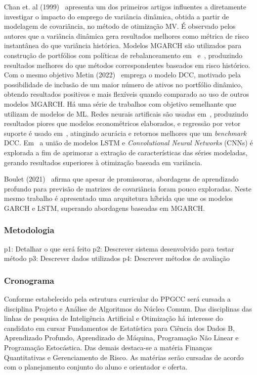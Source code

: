 \documentclass[a4paper, 12pt]{article}
\begin{document}
\begin{spacing}{.9  }
Chan et. al (1999)~\cite{chan1999portfolio} apresenta um dos primeiros artigos
influentes a diretamente investigar o impacto do emprego de variância dinâmica,
obtida a partir de modelagem de covariância, no método de otimização MV. É
observado pelos autores que a variância dinâmica gera resultados melhores como
métrica de risco instantânea do que variância histórica. Modelos MGARCH são
utilizados para construção de portfólios com políticas de rebalanceamento
em~\cite{holten} e~\cite{weirum}, produzindo resultados melhores do que métodos
correspondentes baseados em risco histórico. Com o mesmo objetivo Metin
(2022)~\cite{metin} emprega o modelo DCC, motivado pela possibilidade de
inclusão de um maior número de ativos no portfólio dinâmico, obtendo resultados
positivos e mais flexíveis quando comparado ao uso de outros modelos MGARCH. Há
uma série de trabalhos com objetivo semelhante que utilizam de modelos de ML.
Redes neurais artificais são usadas em~\cite{ann}, produzindo resultados piores
que modelos econométricos elaborados, e regressão por vetor suporte é usado
em~\cite{svr}, atingindo acurácia e retornos melhores que um \emph{benchmark}
DCC. Em~\cite{dl2} a união de modelos LSTM e \emph{Convolutional Neural
Networks} (CNNs) é explorada a fim de aprimorar a extração de características
das séries modeladas, gerando resultados superiores à otimização baseada em
variância.

Boulet (2021)~\cite{dl_multi} afirma que apesar de promissoras, abordagens de
aprendizado profundo para previsão de matrizes de covariância foram pouco
exploradas. Neste mesmo trabalho é apresentado uma arquitetura híbrida que une
os modelos GARCH e LSTM, superando abordagens baseadas em MGARCH.

\subsubsection*{Metodologia}

p1: Detalhar o que será feito
p2: Descrever sistema desenvolvido para testar método
p3: Descrever dados utilizados
p4: Descrever métodos de avaliação


\subsubsection*{Cronograma}

Conforme estabelecido pela estrutura curricular do PPGCC será cursada a
disciplina Projeto e Análise de Algoritmos do Núcleo Comum. Das disciplinas das
linhas de pesquisa de Inteligência Artificial e Otimização há interesse do
candidato em cursar Fundamentos de Estatística para Ciência dos Dados B,
Aprendizado Profundo, Aprendizado de Máquina, Programação Não Linear e
Programação Estocástica. Das demais destaca-se a matéria Finanças Quantitativas
e Gerenciamento de Risco. As matérias serão cursadas de acordo com o
planejamento conjunto do aluno e orientador e oferta.


\end{spacing}
\end{document}
